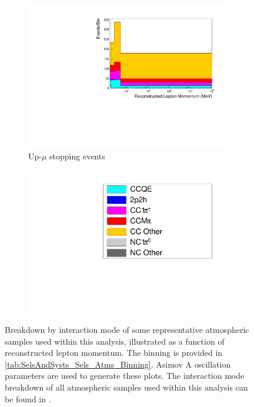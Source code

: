 \begin{figure}[ht]
\begin{subfigure}[t]{0.49\textwidth}
    \includegraphics[width=\textwidth, trim= 0 0 0 30, clip]{Figures/Selections/AtmSpectra_ByMode/UpStop-mu_X.pdf}
    \caption{Up-$\mu$ stopping events}
    \end{subfigure}%
    \begin{subfigure}[t]{0.49\textwidth}
    \includegraphics[page=1,width=\textwidth, trim= 0 0 0 30, clip]{Figures/Selections/AtmSpectra_ByMode/Legend.pdf}
    \end{subfigure}
    \caption{Breakdown by interaction mode of some representative atmospheric samples used within this analysis, illustrated as a function of reconstructed lepton momentum. The binning is provided in \autoref{tab:SelsAndSysts_Sels_Atms_Binning}. Asimov A oscillation parameters are used to generate these plots. The interaction mode breakdown of all atmospheric samples used within this analysis can be found in \cite{t2k_tn_422}. }
    \label{fig:SKSamples:ByModeBreakdown}
\end{figure}

